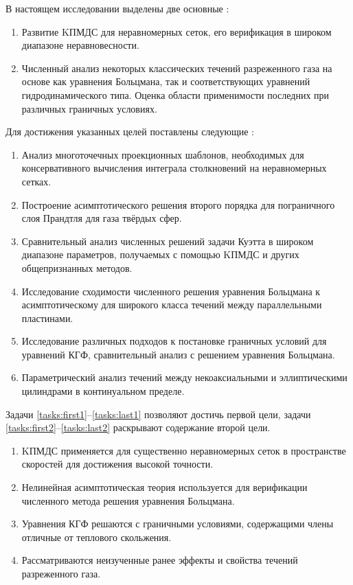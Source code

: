 В настоящем исследовании выделены две основные {\aim}:
\begin{enumerate}
    \item Развитие KПМДС для неравномерных сеток, его верификация в широком диапазоне неравновесности.
    \item Численный анализ некоторых классических течений разреженного газа на основе
    как уравнения Больцмана, так и соответствующих уравнений гидродинамического типа.
    Оценка области применимости последних при различных граничных условиях.
\end{enumerate}
Для достижения указанных целей поставлены следующие {\tasks}:
\begin{enumerate}
    \item Анализ многоточечных проекционных шаблонов, необходимых для консервативного вычисления
    интеграла столкновений на неравномерных сетках.\label{tasks:first1}
    \item Построение асимптотического решения второго порядка
    для пограничного слоя Прандтля для газа твёрдых сфер. \label{tasks:first2}
    \item Сравнительный анализ численных решений задачи Куэтта в широком диапазоне параметров,
    получаемых с помощью KПМДС и других общепризнанных методов.
    \item Исследование сходимости численного решения уравнения Больцмана к асимптотическому
    для широкого класса течений между параллельными пластинами.
    \item Исследование различных подходов к постановке граничных условий для уравнений КГФ,
    сравнительный анализ с решением уравнения Больцмана.\label{tasks:last1}
    \item Параметрический анализ течений между некоаксиальными и эллиптическими цилиндрами
    в континуальном пределе.\label{tasks:last2}
\end{enumerate}
Задачи \ref{tasks:first1}--\ref{tasks:last1} позволяют достичь первой цели,
задачи \ref{tasks:first2}--\ref{tasks:last2} раскрывают содержание второй цели.

{\novelty}
\begin{enumerate}
    \item KПМДС применяется для существенно неравномерных сеток в пространстве скоростей для достижения высокой точности. %
    \item Нелинейная асимптотическая теория используется для верификации численного метода решения уравнения Больцмана. %
    \item Уравнения КГФ решаются с граничными условиями, содержащими члены отличные от теплового скольжения. %
    \item Рассматриваются неизученные ранее эффекты и свойства течений разреженного газа. %
\end{enumerate}

